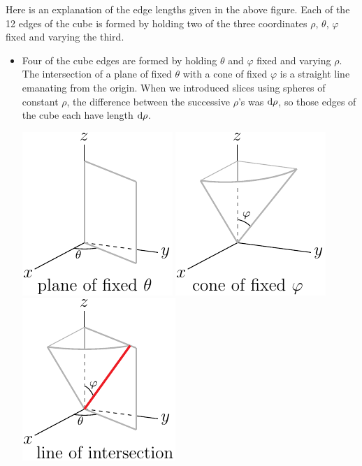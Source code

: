 Here is an explanation of the edge lengths given in the above figure.
Each of the 12 edges of the cube is formed by holding two of the three
coordinates $\rho$, $\theta$, $\varphi$ fixed and varying the third. 
\begin{itemize}
\item 
Four of the cube edges are formed by holding $\theta$ and $\varphi$
fixed and varying $\rho$. The intersection of a plane of fixed $\theta$
with a cone of fixed $\varphi$ is a straight line emanating from the origin.
When we introduced slices using spheres of constant $\rho$, 
the difference between the successive $\rho$'s was $\mathrm{d}\rho$, so
those edges of the cube each have length $\mathrm{d}\rho$.
\begin{efig}
\begin{center}
     \includegraphics{sphereTh.pdf}\quad
     \includegraphics{spherePhi.pdf}\quad
     \includegraphics{sphereThPhiA.pdf}
\end{center}
\end{efig}


\end{itemize}
